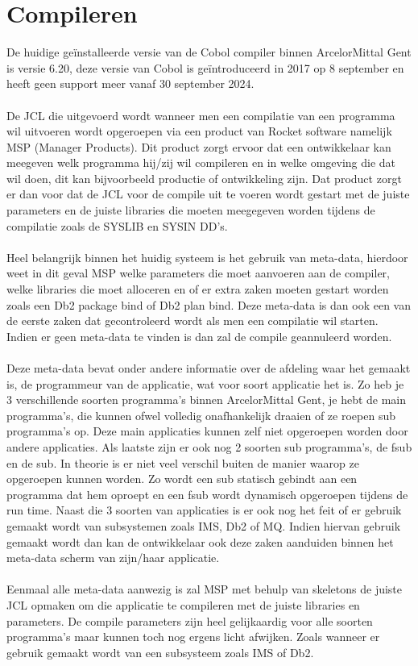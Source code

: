 \section{Compileren}
\label{sec:compileren}
De huidige geïnstalleerde versie van de Cobol compiler binnen ArcelorMittal Gent is versie 6.20, deze versie van Cobol is geïntroduceerd in 2017 op 8 september en heeft geen support meer vanaf 30 september 2024.
\\ \\
De JCL die uitgevoerd wordt wanneer men een compilatie van een programma wil uitvoeren wordt opgeroepen via een product van Rocket software namelijk MSP (Manager Products). Dit product zorgt ervoor dat een ontwikkelaar kan meegeven welk programma hij/zij wil compileren en in welke omgeving die dat wil doen, dit kan bijvoorbeeld productie of ontwikkeling zijn. Dat product zorgt er dan voor dat de JCL voor de compile uit te voeren wordt gestart met de juiste parameters en de juiste libraries die moeten meegegeven worden tijdens de compilatie zoals de SYSLIB en SYSIN DD's.
\\ \\
Heel belangrijk binnen het huidig systeem is het gebruik van meta-data, hierdoor weet in dit geval MSP welke parameters die moet aanvoeren aan de compiler, welke libraries die moet alloceren en of er extra zaken moeten gestart worden zoals een Db2 package bind of Db2 plan bind. Deze meta-data is dan ook een van de eerste zaken dat gecontroleerd wordt als men een compilatie wil starten. Indien er geen meta-data te vinden is dan zal de compile geannuleerd worden. 
\\ \\
Deze meta-data bevat onder andere informatie over de afdeling waar het gemaakt is, de programmeur van de applicatie, wat voor soort applicatie het is. Zo heb je 3 verschillende soorten programma's binnen ArcelorMittal Gent, je hebt de main programma's, die kunnen ofwel volledig onafhankelijk draaien of ze roepen sub programma's op. Deze main applicaties kunnen zelf niet opgeroepen worden door andere applicaties. Als laatste zijn er ook nog 2 soorten sub programma's, de fsub en de sub. In theorie is er niet veel verschil buiten de manier waarop ze opgeroepen kunnen worden. Zo wordt een sub statisch gebindt aan een programma dat hem oproept en een fsub wordt dynamisch opgeroepen tijdens de run time. Naast die 3 soorten van applicaties is er ook nog het feit of er gebruik gemaakt wordt van subsystemen zoals IMS, Db2 of MQ. Indien hiervan gebruik gemaakt wordt dan kan de ontwikkelaar ook deze zaken aanduiden binnen het meta-data scherm van zijn/haar applicatie. 
\\ \\
Eenmaal alle meta-data aanwezig is zal MSP met behulp van skeletons de juiste JCL opmaken om die applicatie te compileren met de juiste libraries en parameters. De compile parameters zijn heel gelijkaardig voor alle soorten programma's maar kunnen toch nog ergens licht afwijken. Zoals wanneer er gebruik gemaakt wordt van een subsysteem zoals IMS of Db2.
\\ \\


